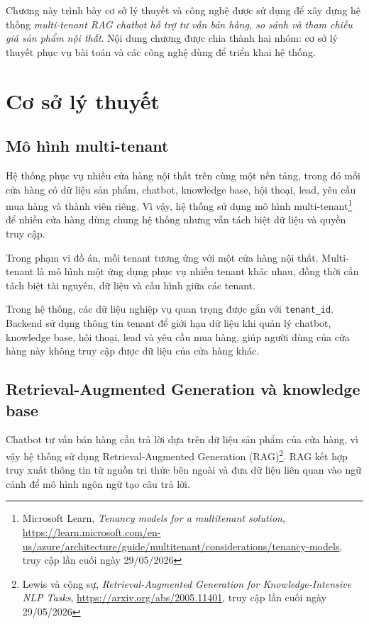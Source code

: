 \documentclass[../DoAn.tex]{subfiles}
\begin{document}
Chương này trình bày cơ sở lý thuyết và công nghệ được sử dụng để xây dựng hệ thống \textit{multi-tenant RAG chatbot hỗ trợ tư vấn bán hàng, so sánh và tham chiếu giá sản phẩm nội thất}. Nội dung chương được chia thành hai nhóm: cơ sở lý thuyết phục vụ bài toán và các công nghệ dùng để triển khai hệ thống.

\section{Cơ sở lý thuyết}
\label{section:3.1}

\subsection{Mô hình multi-tenant}
\label{subsection:3.1.1}

Hệ thống phục vụ nhiều cửa hàng nội thất trên cùng một nền tảng, trong đó mỗi cửa hàng có dữ liệu sản phẩm, chatbot, knowledge base, hội thoại, lead, yêu cầu mua hàng và thành viên riêng. Vì vậy, hệ thống sử dụng mô hình multi-tenant\footnote{Microsoft Learn, \textit{Tenancy models for a multitenant solution}, \url{https://learn.microsoft.com/en-us/azure/architecture/guide/multitenant/considerations/tenancy-models}, truy cập lần cuối ngày 29/05/2026} để nhiều cửa hàng dùng chung hệ thống nhưng vẫn tách biệt dữ liệu và quyền truy cập.

Trong phạm vi đồ án, mỗi tenant tương ứng với một cửa hàng nội thất. Multi-tenant là mô hình một ứng dụng phục vụ nhiều tenant khác nhau, đồng thời cần tách biệt tài nguyên, dữ liệu và cấu hình giữa các tenant.

Trong hệ thống, các dữ liệu nghiệp vụ quan trọng được gắn với \texttt{tenant\_id}. Backend sử dụng thông tin tenant để giới hạn dữ liệu khi quản lý chatbot, knowledge base, hội thoại, lead và yêu cầu mua hàng, giúp người dùng của cửa hàng này không truy cập được dữ liệu của cửa hàng khác.

\subsection{Retrieval-Augmented Generation và knowledge base}
\label{subsection:3.1.2}

Chatbot tư vấn bán hàng cần trả lời dựa trên dữ liệu sản phẩm của cửa hàng, vì vậy hệ thống sử dụng Retrieval-Augmented Generation (RAG)\footnote{Lewis và cộng sự, \textit{Retrieval-Augmented Generation for Knowledge-Intensive NLP Tasks}, \url{https://arxiv.org/abs/2005.11401}, truy cập lần cuối ngày 29/05/2026}. RAG kết hợp truy xuất thông tin từ nguồn tri thức bên ngoài và đưa dữ liệu liên quan vào ngữ cảnh để mô hình ngôn ngữ tạo câu trả lời.
\end{document}
